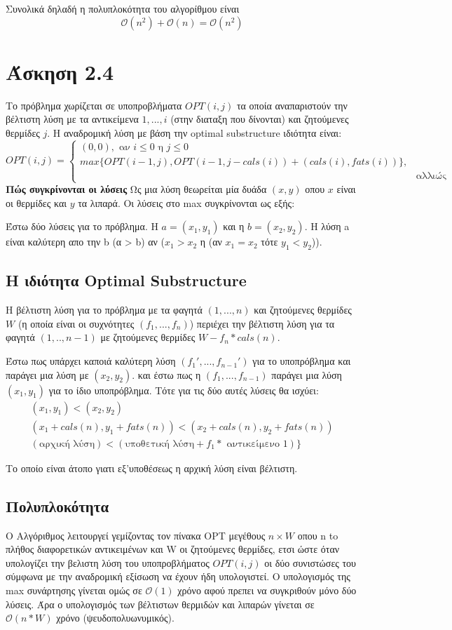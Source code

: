\documentclass{article}
\renewcommand{\O}{\mathcal{O}}
\begin{document}
Συνολικά δηλαδή η πολυπλοκότητα του αλγορίθμου είναι 
\[
\O(n^2) + \O(n) = \O(n^2)
\]
\section{Άσκηση 2.4}
Το πρόβλημα χωρίζεται σε υποπροβλήματα $OPT(i,j)$ τα οποία αναπαριστούν
την βέλτιστη λύση με τα αντικείμενα $1,...,i$ (στην διαταξη που δίνονται) και ζητούμενες θερμίδες
$j$. Η αναδρομική λύση με βάση την optimal substructure ιδιότητα είναι:
\[
OPT(i,j) = \left\{
\begin{array}{ll}
	 (0,0),  \text{ αν } i \leq 0 \text{ η } j \leq 0  \\
	 max\{OPT(i-1,j) , OPT(i-1,j-cals(i)) + (cals(i),fats(i))\},\\ & \text{αλλιώς} 
	
\end{array}	
\right.
\]
\textbf{Πώς συγκρίνονται οι λύσεις}
Ως μια λύση θεωρείται μία δυάδα $(x,y)$ οπου $x$ είναι οι θερμίδες
και $y$ τα λιπαρά. Οι λύσεις στο max συγκρίνονται ως εξής:

Έστω δύο λύσεις για το πρόβλημα. Η $a = (x_1,y_1)$ και η $b = (x_2,y_2)$.
Η λύση a είναι καλύτερη απο την b (α > b) αν ($x_1 > x_2$ η (αν 
$x_1 = x_2$ τότε $y_1 < y_2$)).
\subsection{Η ιδιότητα Optimal Substructure}
Η βέλτιστη λύση για το πρόβλημα με τα φαγητά $(1,...,n)$ και ζητούμενες θερμίδες $W$ (η οποία είναι οι συχνότητες $(f_1,...,f_n)$)
περιέχει την βέλτιστη λύση για τα φαγητά $(1,..,n-1)$ με ζητούμενες θερμίδες $W-f_n*cals(n)$.

Έστω πως υπάρχει καποιά καλύτερη λύση $(f_1',...,f_{n-1}')$ για το υποπρόβλημα και παράγει μια λύση με $(x_2,y_2) $.
και έστω πως η $(f_1,...,f_{n-1})$ παράγει μια λύση $(x_1,y_1)$ για το ίδιο υποπρόβλημα. Τότε για τις δύο αυτές λύσεις 
θα ισχύει:
\begin{eqnarray}
	(x_1,y_1)  < (x_2,y_2) \\
	(x_1 + cals(n),y_1+fats(n)) <  (x_2+cals(n),y_2+fats(n))\\
	(\text{αρχική λύση} ) < (\text{υποθετική λύση}+ f_1* \text{ αντικείμενο 1}) \} 
\end{eqnarray}

Το οποίο είναι άτοπο γιατι εξ'υποθέσεως η αρχική λύση είναι βέλτιστη.
\subsection{Πολυπλοκότητα}
Ο Αλγόριθμος λειτουργεί γεμίζοντας τον πίνακα OPT μεγέθους $n \times W$
οπου n to πλήθος διαφορετικών αντικειμένων και W οι ζητούμενες θερμίδες, ετσι ώστε όταν 
υπολογίζει την βελιστη λύση του υποπροβλήματος $OPT(i,j)$ οι δύο συνιστώσες
του σύμφωνα με την αναδρομική εξίσωση να έχουν ήδη υπολογιστεί. Ο υπολογισμός
της max συνάρτησης γίνεται ομώς σε $\O(1)$ χρόνο αφού πρεπει να συγκριθούν μόνο
δύο λύσεις. Άρα ο υπολογισμός των βέλτιστων θερμιδών και λιπαρών γίνεται
σε $\O(n*W)$ χρόνο (ψευδοπολυωνυμικός).
\end{document}
